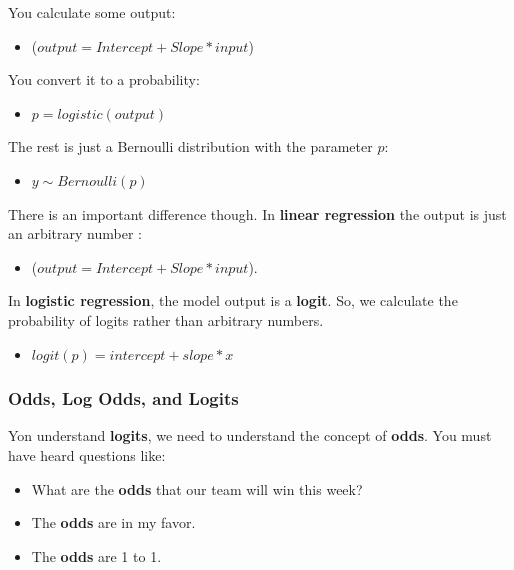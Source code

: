\documentclass[
]{book}
\providecommand{\tightlist}{%
  \setlength{\itemsep}{0pt}\setlength{\parskip}{0pt}}
\begin{document}
You calculate some output:

\begin{itemize}
\tightlist
\item
  (\(output = Intercept + Slope * input\))
\end{itemize}

You convert it to a probability:

\begin{itemize}
\tightlist
\item
  \(p = logistic(output)\)
\end{itemize}

The rest is just a Bernoulli distribution with the parameter \(p\):

\begin{itemize}
\tightlist
\item
  \(y \sim Bernoulli(p)\)
\end{itemize}

There is an important difference though. In \textbf{linear regression} the output is just an arbitrary number :

\begin{itemize}
\tightlist
\item
  (\(output = Intercept + Slope * input\)).
\end{itemize}

In \textbf{logistic regression}, the model output is a \textbf{logit}. So, we calculate the probability of logits rather than arbitrary numbers.

\begin{itemize}
\tightlist
\item
  \(logit(p)= intercept + slope * x\)
\end{itemize}

\subsubsection{Odds, Log Odds, and Logits}\label{odds-log-odds-and-logits}

Yon understand \textbf{logits}, we need to understand the concept of \textbf{odds}. You must have heard questions like:

\begin{itemize}
\tightlist
\item
  What are the \textbf{odds} that our team will win this week?
\item
  The \textbf{odds} are in my favor.
\item
  The \textbf{odds} are 1 to 1.
\end{itemize}
\end{document}

